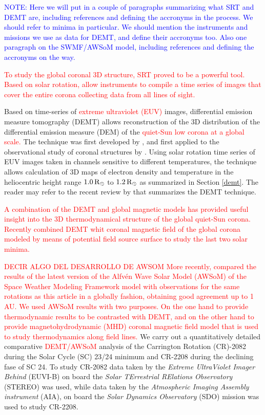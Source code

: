 \documentclass[namedreferences]{solarphysics}
\newcommand{\mrsun}{{\rm R_\odot}}
\def\diego#1{\textcolor{red}{#1}}
\def\notebyalbert#1{\textcolor{blue}{NOTE: #1}}
\begin{document}
\begin{article}
\noindent\notebyalbert{Here we will put in a couple of paragraphs summarizing what SRT and DEMT are, including references and defining the accronyms in the process. We should refer to minima in particular. We should mention the instruments and missions we use as data for DEMT, and define their accronyms too. Also one paragraph on the SWMF/AWSoM model, including references and defining the accronyms on the way.}

\diego{To study the global coronal 3D structure, SRT proved to be a powerful tool. Based on solar rotation, allow instruments to compile a time series of images that cover the entire corona collecting data from all lines of sight.} 

{Based on time-series of \diego{extreme ultraviolet (EUV)} images, differential emission measure tomography (DEMT) allows reconstruction of the 3D distribution of the differential emission measure (DEM) of the \diego{quiet-Sun low corona at a global scale.} The technique was first developed by \citet{frazin_2009}, and first applied to the observational study of coronal structures by \citet{vasquez_2009}. Using solar rotation time series of EUV images taken in channels sensitive to different temperatures, the technique allows calculation of 3D maps of electron density and temperature in the heliocentric height range $1.0\,\mrsun$ to $1.2\,\mrsun$ as summarized in Section \ref{demt}. The reader may refer to the recent review by \citet{vasquez_2016} that summarizes the DEMT technique.

\diego{
A combination of the DEMT and global magnetic models has provided useful insight into the 3D thermodynamical structure of the global quiet-Sun corona. Recently \citet{lloveras_2017} combined DEMT whit coronal magnetic field of the global corona modeled by means of potential field source surface to study the last two solar minima.
}

\diego{DECIR ALGO DEL DESARROLLO DE AWSOM
More recently, \citet{sachdeva_2019} compared the results of the latest version of the Alfvén Wave Solar Model (AWSoM) of the Space Weather Modeling Framework model with observations for the same rotations as this article in a globally fashion, obtaining good agreement up to 1 AU.
We used AWSoM results with two purposes. On the one hand to provide thermodynamic results to be contrasted with DEMT, and on the other hand to provide magnetohydrodynamic (MHD) coronal magnetic field model that is used to study thermodynamics along field lines.
}
We carry out a quantitatively detailed comparative \diego{DEMT/AWSoM} analysis of the Carrington Rotation (CR)-2082 during the Solar Cycle (SC) 23/24 minimum and CR-2208 during the declining fase of SC 24. To study CR-2082 data taken by the \textit{Extreme UltraViolet Imager Behind} (EUVI-B) on board the \textit{Solar TErrestrial RElations Observatory} (STEREO) was used, while data taken by the \textit{Atmospheric Imaging Assembly instrument} (AIA), on board the \textit{Solar Dynamics Observatory} (SDO) mission was used to study CR-2208.

}
\end{article}
\end{document}
